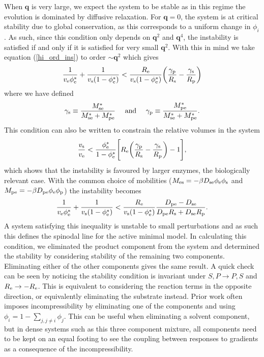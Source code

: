 When $\bm{q}$ is very large, we expect the system to be stable as in this regime the evolution is dominated by diffusive relaxation. For $\bm{q} = 0$, the system is at critical stability due to global conservation, as this corresponds to a uniform change in $\phi_i$. As such, since this condition only depends on $\bm{q}^2$ and $\bm{q}^4$, the instability is satisfied if and only if it is satisfied for very small $\bm{q}^2$. With this in mind we take equation (\ref{hi_ord_ins}) to order $\sim\bm{q}^2$ which gives
\begin{align}
    \frac{1}{v_{\mathrm{e}}\phi_{\mathrm{e}}^*}+\frac{1}{v_{\mathrm{s}}(1-\phi_{\mathrm{e}}^*)} < \frac{R_\mathrm{e} }{v_{\mathrm{s}}(1-\phi_{\mathrm{e}}^*)}\bigg(\frac{\gamma_\mathrm{p}}{R_\mathrm{s} }-\frac{\gamma_\mathrm{s}}{R_\mathrm{p} }\bigg)
    \label{2-eq_form_cond}
\end{align}
where we have defined
\begin{equation}
    \gamma_\mathrm{s} \equiv \frac{M_{\mathrm{se}}^*}{M_{\mathrm{se}}^*+M_{\mathrm{pe}}^*} \quad \text{   and    } \quad \gamma_\mathrm{p} \equiv \frac{M_{\mathrm{pe}}^*}{M_{\mathrm{se}}^*+M_{\mathrm{pe}}^*}.
\end{equation}
This condition can also be written to constrain the relative volumes in the system
\begin{equation}
    \frac{v_{\mathrm{s}}}{v_{\mathrm{e}}} < \frac{\phi_{\mathrm{e}}^*}{1-\phi_{\mathrm{e}}^*}\Bigg[R_\mathrm{e} \bigg(\frac{\gamma_\mathrm{p}}{R_\mathrm{s} }-\frac{\gamma_\mathrm{s}}{R_\mathrm{p} }\bigg) - 1\Bigg],
    \label{vol_ins}
\end{equation}
which shows that the instability is favoured by larger enzymes, the biologically relevant case. With the common choice of mobilities ($M_{\mathrm{es}} = -\beta D_{\mathrm{se}}\phi_{\mathrm{e}}\phi_{\mathrm{s}}$ and $M_{\mathrm{pe}} = -\beta D_{\mathrm{pe}}\phi_{\mathrm{e}}\phi_{\mathrm{p}}$) the instability becomes
\begin{equation}
    \frac{1}{v_{\mathrm{e}}\phi_{\mathrm{e}}^*}+\frac{1}{v_{\mathrm{s}}(1-\phi_{\mathrm{e}}^*)} < \frac{R_\mathrm{e} }{v_{\mathrm{s}}(1-\phi_{\mathrm{e}}^*)}\frac{D_{\mathrm{pe}}-D_{\mathrm{se}}}{D_{\mathrm{pe}}R_\mathrm{s} +D_{\mathrm{se}}R_\mathrm{p} }. \label{eq:2-inst}
\end{equation}
A system satisfying this inequality is unstable to small perturbations and as such this defines the spinodal line for the active minimal model. In calculating this condition, we eliminated the product component from the system and determined the stability by considering stability of the remaining two components. Eliminating either of the other components gives the same result. A quick check can be seen by noticing the stability condition is invariant under $S, P \rightarrow P, S$ and $R_\mathrm{e} \rightarrow -R_\mathrm{e}$. This is equivalent to considering the reaction terms in the opposite direction, or equivalently eliminating the substrate instead. Prior work often imposes incompressibility by eliminating one of the components and using $\phi_i = 1-\sum_{j,j\neq i}\phi_j$. This can be useful when eliminating a solvent component, but in dense systems such as this three component mixture, all components need to be kept on an equal footing to see the coupling between responses to gradients as a consequence of the incompressibility.

